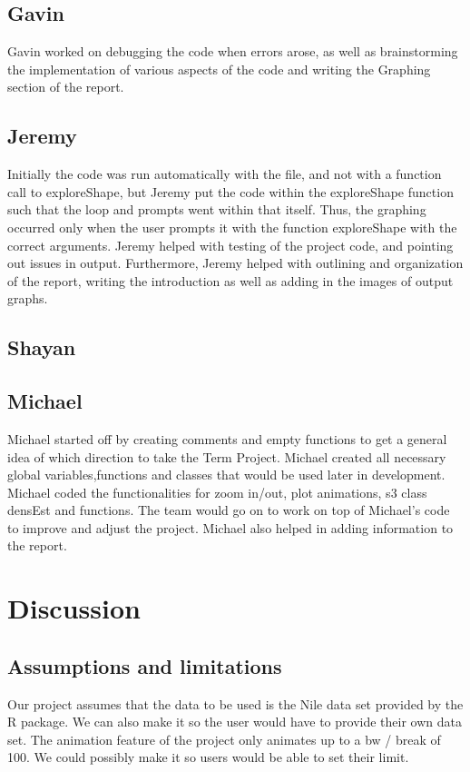 \documentclass{article}
\begin{document}
\subsection{Gavin}
Gavin worked on debugging the code when errors arose, as well as brainstorming the implementation of various aspects of the code and writing the Graphing section of the report.

\subsection{Jeremy}
Initially the code was run automatically with the file, and not with a function call to exploreShape, but Jeremy put the code within the exploreShape function such that the loop and prompts went within that itself. Thus, the graphing occurred only when the user prompts it with the function exploreShape with the correct arguments. Jeremy helped with testing of the project code, and pointing out issues in output. Furthermore, Jeremy helped with outlining and organization of the report, writing the introduction as well as adding in the images of output graphs.

\subsection{Shayan}

\subsection{Michael}
Michael started off by creating comments and empty functions to get a general idea of which direction to take the Term Project. Michael created all necessary global variables,functions and classes that would be used later in development. Michael coded the functionalities for zoom in/out, plot animations, s3 class densEst and functions. The team would go on to work on top of Michael's code to improve and adjust the project. Michael also helped in adding information to the report.

\section{Discussion}
\subsection{Assumptions and limitations}
Our project assumes that the data to be used is the Nile data set provided by the R package. We can also make it so the user would have to provide their own data set. 
The animation feature of the project only animates up to a bw / break of 100. We could possibly make it so users would be able to set their limit. 
\end{document}
